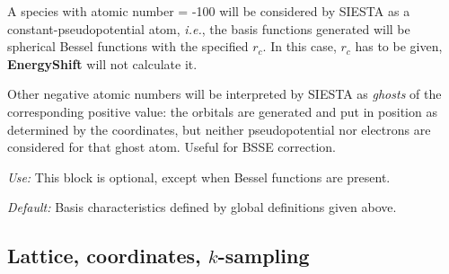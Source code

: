 \begin{description}

A species with atomic number = -100 will be considered by SIESTA as
a constant-pseudopotential atom, {\it i.e.}, the basis functions
generated will be spherical Bessel functions
with the specified $r_c$. In this case, $r_c$ has to be given, 
{\bf EnergyShift} will not calculate it.

Other negative atomic numbers will be interpreted by SIESTA as 
{\it ghosts} 
of the corresponding positive value: the orbitals
are generated and put in position as determined by the coordinates,
but neither pseudopotential nor electrons are considered for that
ghost atom. Useful for BSSE correction.


{\it Use:} This block is optional, except when Bessel functions are present. 

{\it Default:} Basis characteristics defined by global definitions given
above.

\end{description}


\vspace{5pt}
\subsection{Lattice, coordinates, $k$-sampling}

